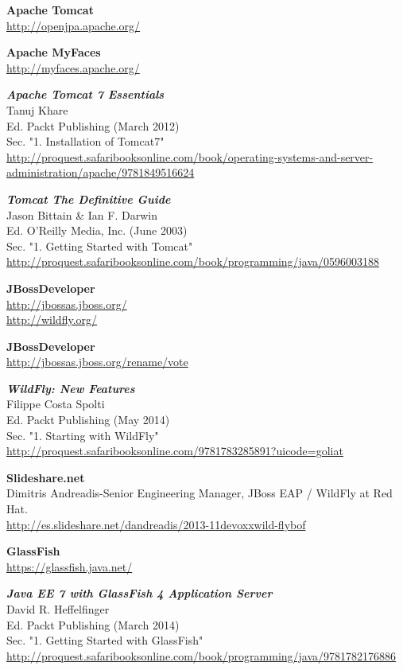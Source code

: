 \documentclass[a4paper, 10pt]{article}
\begin{document}
\begin{thebibliography}{10}
	\textbf{Apache Tomcat}\\
		\url{http://openjpa.apache.org/}

	\textbf{Apache MyFaces}\\
		\url{http://myfaces.apache.org/}

	\textbf{\textit{Apache Tomcat 7 Essentials}}\\
	Tanuj Khare\\
	Ed. Packt Publishing (March 2012)\\
	Sec. "1. Installation of Tomcat7"\\
		\url{http://proquest.safaribooksonline.com/book/operating-systems-and-server-administration/apache/9781849516624}
	
	\textbf{\textit{Tomcat The Definitive Guide}}\\
	Jason Bittain \& Ian F. Darwin\\
	Ed. O'Reilly Media, Inc. (June 2003)\\
	Sec. "1. Getting Started with Tomcat"\\
		\url{http://proquest.safaribooksonline.com/book/programming/java/0596003188}
	
	\textbf{JBossDeveloper}\\
		\url{http://jbossas.jboss.org/}\\
		\url{http://wildfly.org/}
	
	\textbf{JBossDeveloper}\\
		\url{http://jbossas.jboss.org/rename/vote}
	
	\textbf{\textit{WildFly: New Features}}\\
	Filippe Costa Spolti\\
	Ed. Packt Publishing (May 2014)\\
	Sec. "1. Starting with WildFly"\\
		\url{http://proquest.safaribooksonline.com/9781783285891?uicode=goliat} 
	
	\textbf{Slideshare.net}\\
	Dimitris Andreadis-Senior Engineering Manager, JBoss EAP / WildFly at Red Hat.\\
		\url{http://es.slideshare.net/dandreadis/2013-11devoxxwild-flybof}
	
	\textbf{GlassFish}\\
		\url{https://glassfish.java.net/}

	\textbf{\textit{Java EE 7 with GlassFish 4 Application Server}}\\
	David R. Heffelfinger\\
	Ed. Packt Publishing (March 2014)\\
	Sec. "1. Getting Started with GlassFish"\\
		\url{http://proquest.safaribooksonline.com/book/programming/java/9781782176886}
		

\end{thebibliography}
\end{document}
